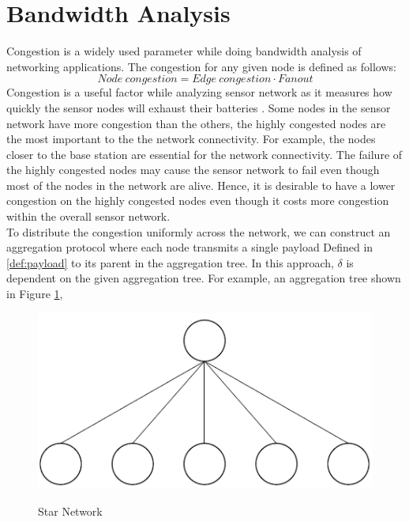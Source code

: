 \section{Bandwidth Analysis}
	Congestion is a widely used parameter while doing bandwidth analysis of networking applications.
	The congestion for any given node is defined as follows:
	\begin{equation}\label{def:congestion}
		Node\ congestion = Edge\ congestion \cdot Fanout
	\end{equation}
	Congestion is a useful factor while analyzing sensor network as it measures how quickly the sensor nodes will exhaust their batteries \cite{madden2003design}. 
	Some nodes in the sensor network have more congestion than the others, the highly congested nodes are the most important to the the network connectivity.
	For example, the nodes closer to the base station are essential for the network connectivity.
	The failure of the highly congested nodes may cause the sensor network to fail even though most of the nodes in the network are alive.
	Hence, it is desirable to have a lower congestion on the highly congested nodes even though it costs more congestion within the overall sensor network.\\
	To distribute the congestion uniformly across the network, we can construct an aggregation protocol where each node transmits a single payload Defined in \ref{def:payload} to its parent in the aggregation tree.
	In this approach, $\delta$ is dependent on the given aggregation tree.
	For example, an aggregation tree shown in Figure \ref{fig:star-network}, 
	\begin{figure}[h!]
		\centering
		\includegraphics[scale = 1]{images/star-tree.png}\\
		\caption{Star Network}
		\label{fig:star-network}
	\end{figure}
